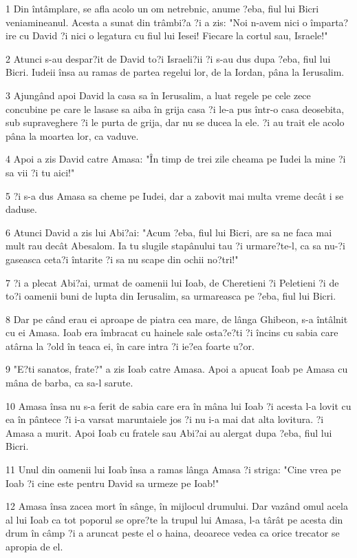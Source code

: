 \par 1 Din întâmplare, se afla acolo un om netrebnic, anume ?eba, fiul lui Bicri veniamineanul. Acesta a sunat din trâmbi?a ?i a zis: "Noi n-avem nici o împarta?ire cu David ?i nici o legatura cu fiul lui Iesei! Fiecare la cortul sau, Israele!"
\par 2 Atunci s-au despar?it de David to?i Israeli?ii ?i s-au dus dupa ?eba, fiul lui Bicri. Iudeii însa au ramas de partea regelui lor, de la Iordan, pâna la Ierusalim.
\par 3 Ajungând apoi David la casa sa în Ierusalim, a luat regele pe cele zece concubine pe care le lasase sa aiba în grija casa ?i le-a pus într-o casa deosebita, sub supraveghere ?i le purta de grija, dar nu se ducea la ele. ?i au trait ele acolo pâna la moartea lor, ca vaduve.
\par 4 Apoi a zis David catre Amasa: "În timp de trei zile cheama pe Iudei la mine ?i sa vii ?i tu aici!"
\par 5 ?i s-a dus Amasa sa cheme pe Iudei, dar a zabovit mai multa vreme decât i se daduse.
\par 6 Atunci David a zis lui Abi?ai: "Acum ?eba, fiul lui Bicri, are sa ne faca mai mult rau decât Abesalom. Ia tu slugile stapânului tau ?i urmare?te-l, ca sa nu-?i gaseasca ceta?i întarite ?i sa nu scape din ochii no?tri!"
\par 7 ?i a plecat Abi?ai, urmat de oamenii lui Ioab, de Cheretieni ?i Peletieni ?i de to?i oamenii buni de lupta din Ierusalim, sa urmareasca pe ?eba, fiul lui Bicri.
\par 8 Dar pe când erau ei aproape de piatra cea mare, de lânga Ghibeon, s-a întâlnit cu ei Amasa. Ioab era îmbracat cu hainele sale osta?e?ti ?i încins cu sabia care atârna la ?old în teaca ei, în care intra ?i ie?ea foarte u?or.
\par 9 "E?ti sanatos, frate?" a zis Ioab catre Amasa. Apoi a apucat Ioab pe Amasa cu mâna de barba, ca sa-l sarute.
\par 10 Amasa însa nu s-a ferit de sabia care era în mâna lui Ioab ?i acesta l-a lovit cu ea în pântece ?i i-a varsat maruntaiele jos ?i nu i-a mai dat alta lovitura. ?i Amasa a murit. Apoi Ioab cu fratele sau Abi?ai au alergat dupa ?eba, fiul lui Bicri.
\par 11 Unul din oamenii lui Ioab însa a ramas lânga Amasa ?i striga: "Cine vrea pe Ioab ?i cine este pentru David sa urmeze pe Ioab!"
\par 12 Amasa însa zacea mort în sânge, în mijlocul drumului. Dar vazând omul acela al lui Ioab ca tot poporul se opre?te la trupul lui Amasa, l-a târât pe acesta din drum în câmp ?i a aruncat peste el o haina, deoarece vedea ca orice trecator se apropia de el.
